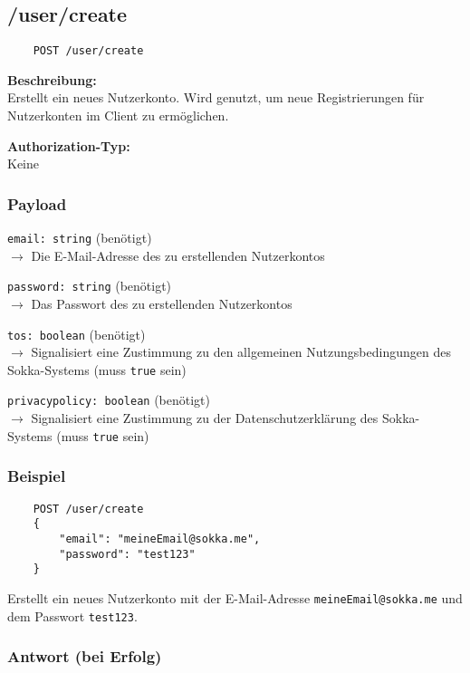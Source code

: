 \subsection{/user/create}

\begin{lstlisting}
    POST /user/create
\end{lstlisting}

\textbf{Beschreibung:} \\
Erstellt ein neues Nutzerkonto. Wird genutzt, um neue Registrierungen für Nutzerkonten im Client zu ermöglichen.

\textbf{Authorization-Typ:} \\
Keine

\subsubsection{Payload}

\lstinline{email: string} (benötigt) \\
$\rightarrow$ Die E-Mail-Adresse des zu erstellenden Nutzerkontos

\lstinline{password: string} (benötigt) \\
$\rightarrow$ Das Passwort des zu erstellenden Nutzerkontos

\lstinline{tos: boolean} (benötigt) \\
$\rightarrow$ Signalisiert eine Zustimmung zu den allgemeinen Nutzungsbedingungen des Sokka-Systems (muss \lstinline{true} sein)

\lstinline{privacypolicy: boolean} (benötigt) \\
$\rightarrow$ Signalisiert eine Zustimmung zu der Datenschutzerklärung des Sokka-Systems (muss \lstinline{true} sein)

\subsubsection{Beispiel}

\begin{lstlisting}
    POST /user/create
    {
        "email": "meineEmail@sokka.me",
        "password": "test123"
    }
\end{lstlisting}

Erstellt ein neues Nutzerkonto mit der E-Mail-Adresse \lstinline{meineEmail@sokka.me} und dem Passwort \lstinline{test123}.

\subsubsection{Antwort (bei Erfolg)}

